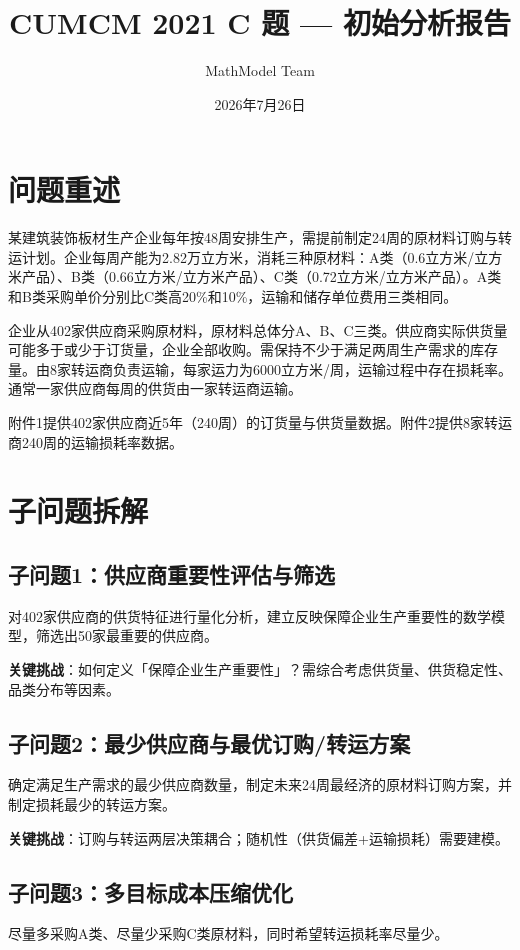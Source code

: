 \documentclass{internal-report}
\title{CUMCM 2021 C 题 — 初始分析报告}
\author{MathModel Team}
\date{2026年7月26日}
\begin{document}
\maketitle

\section{问题重述}

某建筑装饰板材生产企业每年按48周安排生产，需提前制定24周的原材料订购与转运计划。企业每周产能为2.82万立方米，消耗三种原材料：A类（0.6立方米/立方米产品）、B类（0.66立方米/立方米产品）、C类（0.72立方米/立方米产品）。A类和B类采购单价分别比C类高20\%和10\%，运输和储存单位费用三类相同。

企业从402家供应商采购原材料，原材料总体分A、B、C三类。供应商实际供货量可能多于或少于订货量，企业全部收购。需保持不少于满足两周生产需求的库存量。由8家转运商负责运输，每家运力为6000立方米/周，运输过程中存在损耗率。通常一家供应商每周的供货由一家转运商运输。

附件1提供402家供应商近5年（240周）的订货量与供货量数据。附件2提供8家转运商240周的运输损耗率数据。

\section{子问题拆解}

\subsection{子问题1：供应商重要性评估与筛选}
对402家供应商的供货特征进行量化分析，建立反映保障企业生产重要性的数学模型，筛选出50家最重要的供应商。

\textbf{关键挑战}：如何定义「保障企业生产重要性」？需综合考虑供货量、供货稳定性、品类分布等因素。

\subsection{子问题2：最少供应商与最优订购/转运方案}
确定满足生产需求的最少供应商数量，制定未来24周最经济的原材料订购方案，并制定损耗最少的转运方案。

\textbf{关键挑战}：订购与转运两层决策耦合；随机性（供货偏差+运输损耗）需要建模。

\subsection{子问题3：多目标成本压缩优化}
尽量多采购A类、尽量少采购C类原材料，同时希望转运损耗率尽量少。
\end{document}
